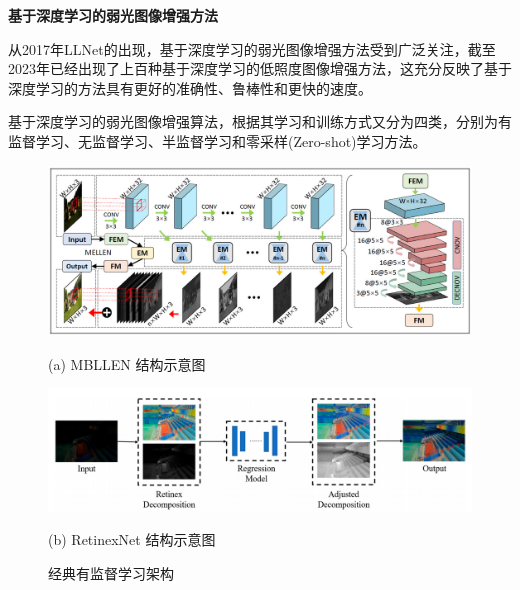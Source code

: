 \documentclass[CJK,aspectratio=169]{beamer}  %
\begin{document}
	\begin{frame}
		{ \yahei \textbf{基于深度学习的弱光图像增强方法}}
		
		{ \yahei 从2017年LLNet\textcolor{blue}{\citep{lore2017llnet}}的出现，基于深度学习的弱光图像增强方法受到广泛关注，截至2023年已经出现了上百种基于深度学习的低照度图像增强方法，这充分反映了基于深度学习的方法具有更好的准确性、鲁棒性和更快的速度。}
		
		\vspace{0.1cm}
		
		{ \yahei 基于深度学习的弱光图像增强算法，根据其学习和训练方式又分为四类，分别为有监督学习、无监督学习、半监督学习和零采样(Zero-shot)学习方法\textcolor{blue}{\citep{tang2023low}}。}
		
		\vspace{0.1cm}
		
		\begin{figure}
			\centering
			\setlength{\abovecaptionskip}{-0.05cm}			
			\begin{minipage}{.45\columnwidth}
				\setlength{\abovecaptionskip}{-0.05cm}
				\centering 
				\includegraphics[width=0.85\columnwidth]{picture/LLIE/MBLLEN/MBLLEN Architecture}
				\caption*{
					\label{fig: MBLLEN} 
					\tiny (a) MBLLEN 结构示意图
				}
			\end{minipage}
			\begin{minipage}{.45\columnwidth}
				\setlength{\abovecaptionskip}{-0.05cm}
				\centering 
				\includegraphics[width=\columnwidth]{picture/LLIE/RetinexNet/RetinexNet}
				\caption*{
					\label{fig: RetinexNet} 
					\tiny (b) RetinexNet 结构示意图
				}
			\end{minipage}
			\captionsetup{font=scriptsize}
			\caption{
				\label{fig: Supervised Learning}
				\tiny 经典有监督学习架构
			}
		\end{figure}
		
	\end{frame}
	
\end{document}
